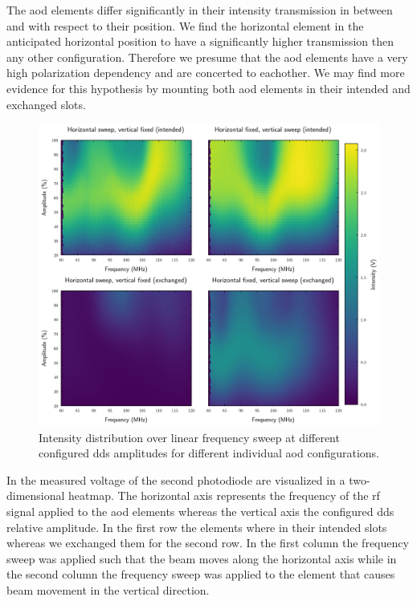 The \gls{aod} elements differ significantly in their intensity transmission
in between and with respect to their position. We find the horizontal element
in the anticipated horizontal position to have a significantly higher
transmission then any other configuration. Therefore we presume that the
\gls{aod} elements have a very high polarization dependency and are concerted
to eachother. We may find more evidence for this hypothesis by mounting both
\gls{aod} elements in their intended and exchanged slots.
\begin{figure}[htb]
  \centering
  \includegraphics[width=\textwidth]
  {../figure/intensity/distribution/paired-amplitude.png}
  \caption{Intensity distribution over linear frequency sweep at different
  configured \gls{dds} amplitudes for different individual \gls{aod}
  configurations.
  }\label{fig:intensity_distribution_paired}
\end{figure}
In  the measured voltage of the
second photodiode are visualized in a two-dimensional heatmap. The horizontal
axis represents the frequency of the \gls{rf} signal applied to the \gls{aod}
elements whereas the vertical axis the configured \gls{dds} relative
amplitude. In the first row the elements where in their intended slots whereas
we exchanged them for the second row. In the first column the frequency
sweep was applied such that the beam moves along the horizontal axis while
in the second column the frequency sweep was applied to the element that
causes beam movement in the vertical direction.

